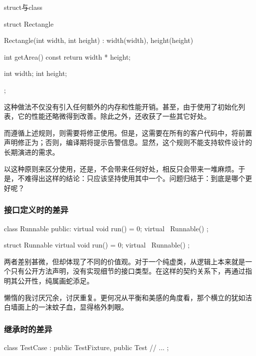 \begin{content}
\begin{episode}{struct与class}
\begin{content}
\begin{c++}
struct Rectangle {
  Rectangle(int width, int height) : width(width), height(height) {
  }

  int getArea() const {
    return width * height;
  }

  int width;
  int height;
};
\end{c++}

这种做法不仅没有引入任何额外的内存和性能开销。甚至，由于使用了初始化列表，它的性能还略微得到改善。除此之外，还收获了一些其它好处。

\begin{enum}
\end{enum}

而遵循上述规则，则需要将修正使用。但是，这需要在所有的客户代码中，将前置声明修正为；否则，编译期将提示告警信息。显然，这个规则不能支持软件设计的长期演进的需求。

以这种原则来区分使用，还是，不会带来任何好处，相反只会带来一堆麻烦。于是，不难得出这样的结论：只应该坚持使用其中一个。问题归结于：到底是哪个更好呢？

\subsubsection{接口定义时的差异}

\begin{c++}
class Runnable {
public:
  virtual void run() = 0;
  virtual ~Runnable() {}
};

struct Runnable {
  virtual void run() = 0;
  virtual ~Runnable() {}
};
\end{c++}

两者差别甚微，但却体现了不同的价值观。对于一个纯虚类，从逻辑上本来就是一个只有公开方法声明，没有实现细节的接口类型。在这样的契约关系下，再通过指明其公开性，纯属画蛇添足。

懒惰的我讨厌冗余，讨厌重复。更何况从平衡和美感的角度看，那个横立的犹如洁白墙面上的一沫蚊子血，显得格外刺眼。

\subsubsection{继承时的差异}

\begin{c++}
class TestCase : public TestFixture, public Test {
  // ...
};


\end{c++}
\end{content}
\end{episode}
\end{content}
